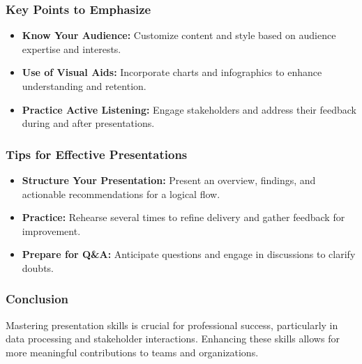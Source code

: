 \documentclass{beamer}
\begin{document}
\begin{frame}[fragile]
    \frametitle{Key Points to Emphasize}
    \begin{itemize}
        \item \textbf{Know Your Audience:} 
            Customize content and style based on audience expertise and interests.
        \item \textbf{Use of Visual Aids:} 
            Incorporate charts and infographics to enhance understanding and retention.
        \item \textbf{Practice Active Listening:} 
            Engage stakeholders and address their feedback during and after presentations.
    \end{itemize}
\end{frame}

\begin{frame}[fragile]
    \frametitle{Tips for Effective Presentations}
    \begin{itemize}
        \item \textbf{Structure Your Presentation:} 
            Present an overview, findings, and actionable recommendations for a logical flow.
        \item \textbf{Practice:} 
            Rehearse several times to refine delivery and gather feedback for improvement.
        \item \textbf{Prepare for Q\&A:} 
            Anticipate questions and engage in discussions to clarify doubts.
    \end{itemize}
\end{frame}

\begin{frame}[fragile]
    \frametitle{Conclusion}
    \begin{block}{}
        Mastering presentation skills is crucial for professional success, particularly in data processing and stakeholder interactions. 
        Enhancing these skills allows for more meaningful contributions to teams and organizations.
    \end{block}
\end{frame}
\end{document}
